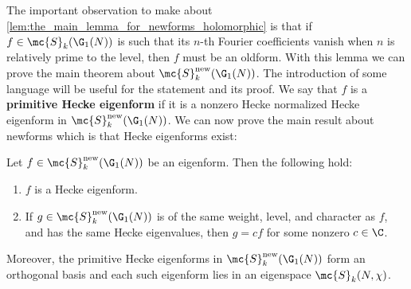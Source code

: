     The important observation to make about \cref{lem:the_main_lemma_for_newforms_holomorphic} is that if $f \in \mc{S}_{k}(\G_{1}(N))$ is such that its $n$-th Fourier coefficients vanish when $n$ is relatively prime to the level, then $f$ must be an oldform. With this lemma we can prove the main theorem about $\mc{S}_{k}^{\mathrm{new}}(\G_{1}(N))$. The introduction of some language will be useful for the statement and its proof. We say that $f$ is a \textbf{primitive Hecke eigenform} if it is a nonzero Hecke normalized Hecke eigenform in $\mc{S}_{k}^{\mathrm{new}}(\G_{1}(N))$. We can now prove the main result about newforms which is that Hecke eigenforms exist:

    \begin{theorem}\label{thm:newforms_characterization_holomorphic}
      Let $f \in \mc{S}_{k}^{\mathrm{new}}(\G_{1}(N))$ be an eigenform. Then the following hold:
      \begin{enumerate}[label=(\roman*)]
        \item $f$ is a Hecke eigenform.
        \item If $g \in \mc{S}_{k}^{\mathrm{new}}(\G_{1}(N))$ is of the same weight, level, and character as $f$, and has the same Hecke eigenvalues, then $g = cf$ for some nonzero $c \in \C$.
      \end{enumerate}
      Moreover, the primitive Hecke eigenforms in $\mc{S}_{k}^{\mathrm{new}}(\G_{1}(N))$ form an orthogonal basis and each such eigenform lies in an eigenspace $\mc{S}_{k}(N,\chi)$.
    \end{theorem}
